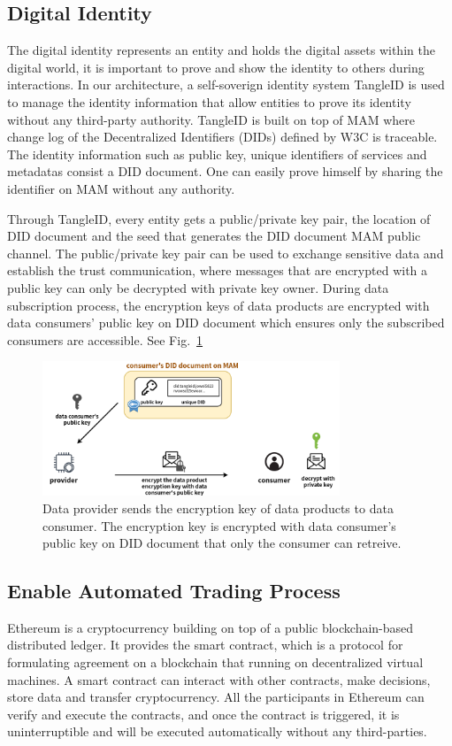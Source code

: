 \documentclass[conference]{IEEEtran}
\begin{document}
\subsection{Digital Identity}
The digital identity represents an entity and holds the digital assets within the digital world, it is important to prove and show the identity to others during interactions. In our architecture, a self-soverign identity system TangleID\cite{TangleID} is used to manage the identity information that allow entities to prove its identity without any third-party authority. TangleID is built on top of MAM where change log of the Decentralized Identifiers (DIDs)\cite{DID} defined by W3C is traceable. The identity information such as public key, unique identifiers of services and metadatas consist a DID document. One can easily prove himself by sharing the identifier on MAM without any authority. 

Through TangleID, every entity gets a public/private key pair, the location of DID document and the seed that generates the DID document MAM public channel. The public/private key pair can be used to exchange sensitive data and establish the trust communication, where messages that are encrypted with a public key can only be decrypted with private key owner. During data subscription process, the encryption keys of data products are encrypted with data consumers' public key on DID document which ensures only the subscribed consumers are accessible. See Fig.~\ref{fig:TangleID}


\begin{figure}[h]
    \centering
    \includegraphics[width=3.5in]{TangleID}
    \caption{Data provider sends the encryption key of data products to data consumer. The encryption key is encrypted with data consumer's public key on DID document that only the consumer can retreive.}
    \label{fig:TangleID}
\end{figure}


\subsection{Enable Automated Trading Process}
Ethereum is a cryptocurrency building on top of a public blockchain-based distributed ledger. It provides the smart contract, which is a protocol for formulating agreement on a blockchain that running on decentralized virtual machines. A smart contract can interact with other contracts, make decisions, store data and transfer cryptocurrency. All the participants in Ethereum can verify and execute the contracts, and once the contract is triggered, it is uninterruptible and will be executed automatically without any third-parties. 
\end{document}
